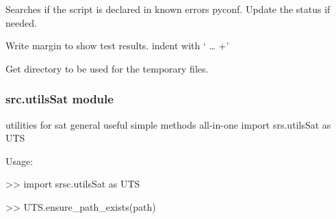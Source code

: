\documentclass[a4paper,10pt,english]{sphinxmanual}
\begin{document}
\begin{fulllineitems}
\begin{fulllineitems}
\end{fulllineitems}


\begin{fulllineitems}
\label{\detokenize{apidoc_src/src:src.test_module.Test.search_known_errors}}
Searches if the script is declared in known errors pyconf.
Update the status if needed.

\end{fulllineitems}


\begin{fulllineitems}
\label{\detokenize{apidoc_src/src:src.test_module.Test.write_test_margin}}
Write margin to show test results.
indent with ‘\textbar{} … +’

\end{fulllineitems}


\end{fulllineitems}


\begin{fulllineitems}
\label{\detokenize{apidoc_src/src:src.test_module.getTmpDirDEFAULT}}
Get directory to be used for the temporary files.

\end{fulllineitems}



\subsubsection{src.utilsSat module}
\label{\detokenize{apidoc_src/src:src-utilssat-module}}\label{\detokenize{apidoc_src/src:module-src.utilsSat}}
utilities for sat
general useful simple methods
all-in-one import srs.utilsSat as UTS

\begin{DUlineblock}{0em}
\item[] Usage:
\item[] \textgreater{}\textgreater{} import srsc.utilsSat as UTS
\item[] \textgreater{}\textgreater{} UTS.ensure\_path\_exists(path)
\end{DUlineblock}
\end{document}
